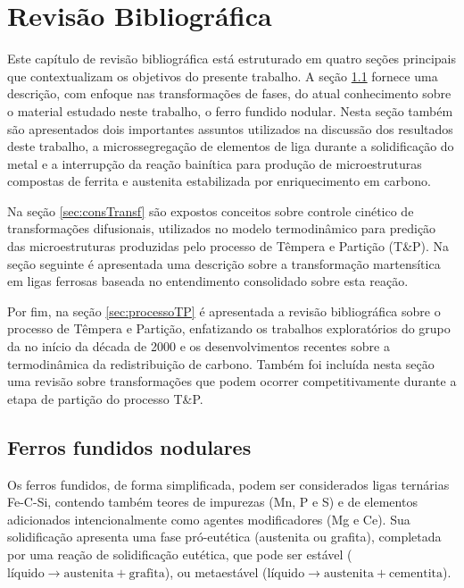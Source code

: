 \chapter{Revisão Bibliográfica}

Este capítulo de revisão bibliográfica está estruturado em quatro seções principais que contextualizam os objetivos do presente trabalho. A seção \ref{sec:Fofos} fornece uma descrição, com enfoque nas transformações de fases, do atual conhecimento sobre o material estudado neste trabalho, o ferro fundido nodular. Nesta seção também são apresentados dois importantes assuntos utilizados na discussão dos resultados deste trabalho, a microssegregação de elementos de liga durante a solidificação do metal e a interrupção da reação bainítica para produção de microestruturas compostas de ferrita e austenita estabilizada por enriquecimento em carbono.

Na seção \ref{sec:consTransf} são expostos conceitos sobre controle cinético de transformações difusionais, utilizados no modelo termodinâmico para predição das microestruturas produzidas pelo processo de Têmpera e Partição (T\&P). Na seção seguinte é apresentada uma descrição sobre a transformação martensítica em ligas ferrosas baseada no entendimento consolidado sobre esta reação. 

Por fim, na seção \ref{sec:processoTP} é apresentada a revisão bibliográfica sobre o processo de Têmpera e Partição, enfatizando os trabalhos exploratórios do grupo da  no início da década de 2000 e os desenvolvimentos recentes sobre a termodinâmica da redistribuição de carbono.
Também foi incluída nesta seção uma revisão sobre transformações que podem ocorrer competitivamente durante a etapa de partição do processo T\&P.

\section{Ferros fundidos nodulares}

\label{sec:Fofos}

Os ferros fundidos, de forma simplificada, podem ser considerados ligas ternárias Fe-C-Si, contendo também teores de impurezas (Mn, P e S) e de elementos adicionados intencionalmente como agentes modificadores (Mg e Ce). Sua solidificação apresenta uma fase pró-eutética (austenita ou grafita), completada por uma reação de solidificação eutética, que pode ser estável ($\text{líquido} \rightarrow \text{austenita} + \text{grafita}$), ou metaestável ($\text{líquido} \rightarrow \text{austenita} + \text{cementita}$).

